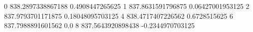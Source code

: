 0 838.2897338867188 0.4908447265625
1 837.8631591796875 0.06427001953125
2 837.9793701171875 0.18048095703125
4 838.4717407226562 0.6728515625
6 837.7988891601562 0.0
8 837.5643920898438 -0.2344970703125
